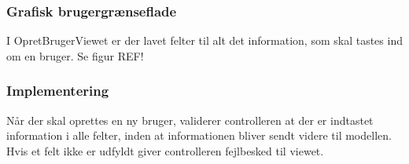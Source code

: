 \subsubsection{Grafisk brugergrænseflade}
I OpretBrugerViewet er der lavet felter til alt det information, som skal tastes ind om en bruger. Se figur REF!

\subsubsection{Implementering}
Når der skal oprettes en ny bruger, validerer controlleren at der er indtastet information i alle felter,
inden at informationen bliver sendt videre til modellen. Hvis et felt ikke er udfyldt giver controlleren fejlbesked til viewet. \\